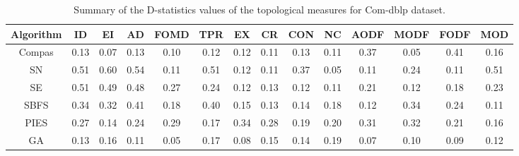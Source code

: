 \begin{table}
\centering
\caption{Summary of the D-statistics values of the topological measures for Com-dblp dataset.}
\label{tab_dblp}
\begin{adjustbox}{max width=\textwidth}
\begin{tabular}{c|c c c c c c c c c c c c c}
\hline
Algorithm & ID & EI & AD & FOMD & TPR & EX & CR & CON & NC & AODF & MODF & FODF & MOD \\ \hline
Compas    & 0.13   & 0.07   & 0.13   & 0.10     & 0.12    & 0.12   & 0.11   & 0.13    & 0.11   & 0.37     & 0.05     & 0.41     & 0.16    \\ 
SN        &  0.51  & 0.60   & 0.54   & 0.11    & 0.51    & 0.12   & 0.11   & 0.37    & 0.05   & 0.11     &   0.24   & 0.11     & 0.51    \\ 
SE        &  0.51  & 0.49   & 0.48   & 0.27    & 0.24    & 0.12   & 0.13   & 0.12    & 0.11   & 0.21     & 0.12     &  0.18    & 0.23    \\ 
SBFS      &  0.34  & 0.32   & 0.41   & 0.18     & 0.40    & 0.15   & 0.13   &  0.14   & 0.18   &  0.12    &   0.34   & 0.24     & 0.11    \\ 
PIES      & 0.27   &  0.14  & 0.24   &  0.29    & 0.17    & 0.34   & 0.28   &  0.19   &  0.20  & 0.31     & 0.32     &  0.21    &  0.16   \\ 
GA        & 0.13   & 0.16   & 0.11   &  0.05    &  0.17  & 0.08   &  0.15  &  0.14   & 0.19   & 0.07     &  0.10    &  0.09    & 0.12    \\ \hline
\end{tabular}
\end{adjustbox}
\vspace{3mm}
\end{table}



